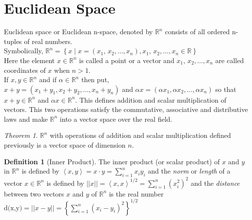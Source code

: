 \documentclass[12pt,oneside,a4paper]{book}
\newcommand{\R}{\mathds{R}}
\newcommand{\xn}[2]{{#1}_1{#2}\,{#1}_2{#2}\dots{#2}{#1}_n}
\newcommand{\norm}[1]{\left\vert\left\vert#1\right\vert\right\vert}
\newcommand{\set}[1]{\left\{#1\right\}}
\newcommand{\seq}[1]{\left<#1\right>}
\theoremstyle{remark}
\newtheorem{thm}{Theorem}[section]
\theoremstyle{definition}
\newtheorem{defn}{Definition}[section]
\begin{document}
\section{Euclidean Space}
Euclidean space or Euclidean n-space, denoted by $ \R^n $ consists of all ordered n-tuples of real numbers.\\
Symbolically, $ \R^n=\set{x\mid x=(\xn{x}{,}), \xn{x}{,}\in \R} $\\
Here the element $ x\in\R^n $ is called a point or a vector and $ \xn{x}{,} $ are called coordinates of $ x $ when $ n>1 $.\\
If $ x,y \in \R^n $ and if $ \alpha\in\R^n $ then put,\\
$ x+y=(x_1+y_1,x_2+y_2,\dots,x_n+y_n) $ and $ \alpha x=(\alpha x_1,\alpha x_2,\dots,\alpha x_n) $ so that $ x+y\in\R^n $ and $ \alpha x\in\R^n $. This defines addition and scalar multiplication of vectors. This two operations satisfy the commutative, associative and distributive laws and make $ \R^n $ into a vector space over the real field.
\begin{thm}
    $ \R^n $ with operations of addition and scalar multiplication defined previously is a vector space of dimension $ n $.
\end{thm}
\begin{defn}[Inner Product]
    The inner product (or scalar product) of $ x $ and $ y $ in $ \R^n $ is defined by $ \seq{x,y}=x\cdot y=\sum_{i=1}^{n} x_i y_i $ and the \emph{norm} or \emph{length} of a vector $ x \in \R^n $ is defined by $ \norm{x}=\seq{x,x}^{1/2}=\sum_{i=1}^{n}\left( x_i^2\right)^2  $ and the \emph{distance} between two vectors $ x $ and $ y $ of $ \R^n $ is the real number $ \text{d(x,y)}=\norm{x-y}=\left\{\sum_{i=1}^{n} \left(x_i-y_i\right)^2\right\}^{1/2} $
\end{defn}
\end{document}
